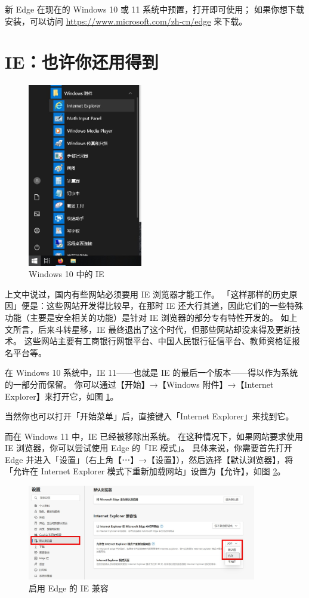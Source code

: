 新 Edge 在现在的 Windows 10 或 11 系统中预置，打开即可使用；
如果你想下载安装，可以访问 \url{https://www.microsoft.com/zh-cn/edge} 来下载。

\section{IE：也许你还用得到}

\begin{figure}
  \centering
  \includegraphics[width=5cm]{assets/IE_on_Win_10.jpg}
  \caption{Windows 10 中的 IE}
  \label{IE_on_Win_10}
\end{figure}

上文中说过，国内有些网站必须要用 IE 浏览器才能工作。
「这样那样的历史原因」便是：这些网站开发得比较早，在那时 IE 还大行其道，因此它们的一些特殊功能（主要是安全相关的功能）是针对 IE 浏览器的部分专有特性开发的。
如上文所言，后来斗转星移，IE 最终退出了这个时代，但那些网站却没来得及更新技术。
这些网站主要有工商银行网银平台、中国人民银行征信平台、教师资格证报名平台等。

在 Windows 10 系统中，IE 11——也就是 IE 的最后一个版本——得以作为系统的一部分而保留。
你可以通过【开始】→【Windows 附件】→【Internet Explorer】来打开它，如图 \ref{IE_on_Win_10}。

当然你也可以打开「开始菜单」后，直接键入「Internet Explorer」来找到它。

而在 Windows 11 中，IE 已经被移除出系统。
在这种情况下，如果网站要求使用 IE 浏览器，你可以尝试使用 Edge 的「IE 模式」。
具体来说，你需要首先打开 Edge 并进入「设置」（右上角【⋯】→【设置】），然后选择【默认浏览器】，将「允许在 Internet Explorer 模式下重新加载网站」设置为【允许】，如图 \ref{Edge_IE_Mode_1}。

\begin{figure}[htb!]
  \centering
  \includegraphics[width=10cm]{assets/Edge_IE_Mode_1.jpg}
  \caption{启用 Edge 的 IE 兼容}
  \label{Edge_IE_Mode_1}
\end{figure}

